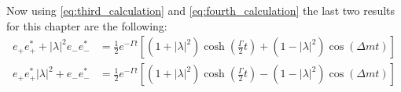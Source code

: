 Now using \cref{eq:third_calculation} and \cref{eq:fourth_calculation} the last two results for this chapter are the following:
\begin{align}
  e_+e_+^* + \left|\lambda\right|^2 e_-e_-^* &= \frac{1}{2}e^{-\Gamma t}\left[\left(1+\left|\lambda\right|^2\right)\cosh\left(\frac{\Gamma}{2}t\right)
  +\left(1-\left|\lambda\right|^2\right)\cos\left(\Delta mt\right)\right]\label{eq:result_3}\\
  e_+e_+^* \left|\lambda\right|^2 + e_-e_-^* &= \frac{1}{2}e^{-\Gamma t}\left[\left(1+\left|\lambda\right|^2\right)\cosh\left(\frac{\Gamma}{2}t\right)
  -\left(1-\left|\lambda\right|^2\right)\cos\left(\Delta mt\right)\right]\label{eq:result_4}
\end{align}
